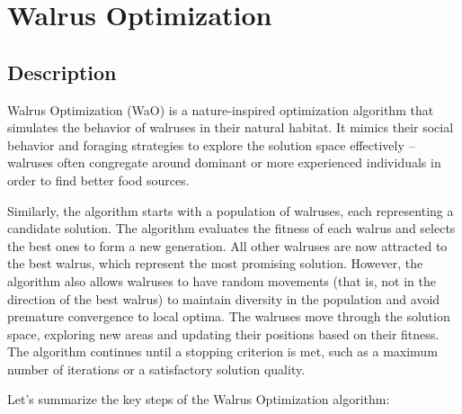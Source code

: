 \documentclass{article}
\begin{document}
\section{Walrus Optimization}

\subsection{Description}

Walrus Optimization (WaO) \cite{walrus} is a nature-inspired
optimization algorithm that simulates the behavior of walruses in
their natural habitat. It mimics their social behavior and foraging
strategies to explore the solution space effectively -- walruses
often congregate around dominant or more experienced individuals in
order to find better food sources.

Similarly, the algorithm starts with a population of walruses, each
representing a candidate solution. The algorithm evaluates the
fitness of each walrus and selects the best ones to form a new
generation. All other walruses are now attracted to the best walrus,
which represent the most promising solution. However, the algorithm
also allows walruses to have random movements (that is, not in the
direction of the best walrus) to maintain diversity in the population
and avoid premature convergence to local optima. The walruses move
through the solution space, exploring new areas and updating their
positions based on their fitness. The algorithm continues until a
stopping criterion is met, such as a maximum number of iterations or
a satisfactory solution quality.

Let's summarize the key steps of the Walrus Optimization algorithm:
\end{document}
